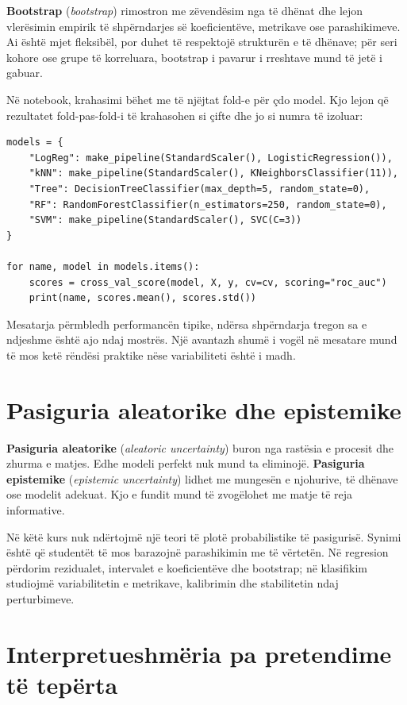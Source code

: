 \documentclass[12pt,a4paper,oneside]{book}
\newcommand{\term}[2]{\textbf{#1} (\textit{#2})}
\begin{document}
\term{Bootstrap}{bootstrap} rimostron me zëvendësim nga të dhënat dhe lejon vlerësimin empirik të shpërndarjes së koeficientëve, metrikave ose parashikimeve. Ai është mjet fleksibël, por duhet të respektojë strukturën e të dhënave; për seri kohore ose grupe të korreluara, bootstrap i pavarur i rreshtave mund të jetë i gabuar.

Në notebook, krahasimi bëhet me të njëjtat fold-e për çdo model. Kjo lejon që rezultatet fold-pas-fold-i të krahasohen si çifte dhe jo si numra të izoluar:
\begin{lstlisting}[caption={Krahasim i disa modeleve me të njëjtën skemë validimi.}]
models = {
    "LogReg": make_pipeline(StandardScaler(), LogisticRegression()),
    "kNN": make_pipeline(StandardScaler(), KNeighborsClassifier(11)),
    "Tree": DecisionTreeClassifier(max_depth=5, random_state=0),
    "RF": RandomForestClassifier(n_estimators=250, random_state=0),
    "SVM": make_pipeline(StandardScaler(), SVC(C=3))
}

for name, model in models.items():
    scores = cross_val_score(model, X, y, cv=cv, scoring="roc_auc")
    print(name, scores.mean(), scores.std())
\end{lstlisting}
Mesatarja përmbledh performancën tipike, ndërsa shpërndarja tregon sa e ndjeshme është ajo ndaj mostrës. Një avantazh shumë i vogël në mesatare mund të mos ketë rëndësi praktike nëse variabiliteti është i madh.

\section{Pasiguria aleatorike dhe epistemike}

\term{Pasiguria aleatorike}{aleatoric uncertainty} buron nga rastësia e procesit dhe zhurma e matjes. Edhe modeli perfekt nuk mund ta eliminojë. \term{Pasiguria epistemike}{epistemic uncertainty} lidhet me mungesën e njohurive, të dhënave ose modelit adekuat. Kjo e fundit mund të zvogëlohet me matje të reja informative.

Në këtë kurs nuk ndërtojmë një teori të plotë probabilistike të pasigurisë. Synimi është që studentët të mos barazojnë parashikimin me të vërtetën. Në regresion përdorim rezidualet, intervalet e koeficientëve dhe bootstrap; në klasifikim studiojmë variabilitetin e metrikave, kalibrimin dhe stabilitetin ndaj perturbimeve.

\section{Interpretueshmëria pa pretendime të tepërta}
\end{document}
